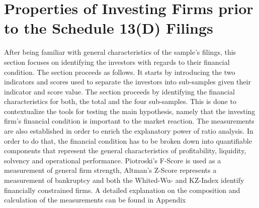 \documentclass[12pt]{article}
\begin{document}
\section{Properties of Investing Firms prior to the Schedule 13(D) Filings}


After being familiar with general characteristics of the sample's filings, this section focuses on identifying the investors with regards to their financial condition. The section proceeds as follows. It starts by introducing the two indicators and scores used to separate the investors into sub-samples given their indicator and score value. The section proceeds by identifying the financial characteristics for both, the total and the four sub-samples. This is done to contextualize the tools for testing the main hypothesis, namely that the investing firm's financial condition is important to the market reaction. The measurements are also established in order to enrich the explanatory power of ratio analysis.
In order to do that, the financial condition has to be broken down into quantifiable components that represent the general characteristics of profitability, liquidity, solvency and operational performance. Piotroski's F-Score is used as a measurement of general firm strength, Altman's Z-Score represents a measurement of bankruptcy and both the Whited-Wu- and KZ-Index identify financially constrained firms. A detailed explanation on the composition and calculation of the measurements can be found in Appendix 

\end{document}
